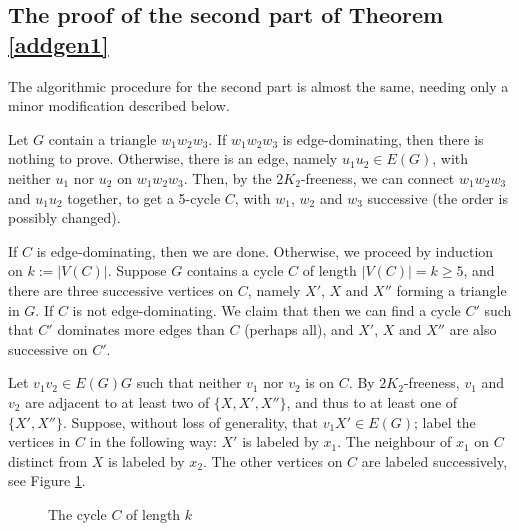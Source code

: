 \documentclass{amsart}
\theoremstyle{definition}
\begin{document}
\subsection{The proof of the second part of Theorem  \ref{addgen1}}
The algorithmic procedure for the second part is almost the same, needing only a minor
modification described below.

Let $G$  contain a triangle $w_1w_2w_3$.
If $w_1w_2w_3$ is edge-dominating, then there is nothing to prove. Otherwise, there is an edge, namely $u_1u_2\in E(G)$, with neither $u_1$ nor $u_2$  on $w_1w_2w_3$. Then, by the $2K_2$-freeness, we can connect $w_1w_2w_3$ and $u_1u_2$ together, to get a 5-cycle $C$, 
with $w_1$, $w_2$ and $w_3$ successive (the order is possibly changed). 

If $C$ is edge-dominating, then we are done. Otherwise, we proceed by induction on
$k:=|V(C)|$. 
Suppose $G$ contains a cycle $C$ of length $|V(C)|=k\ge5$, and there are three successive vertices on $C$, namely $X'$, $X$ and $X''$ forming a triangle in $G$. If $C$ is not edge-dominating. 
We claim that then we can find a cycle $C'$ such that $C'$ dominates more edges than $C$ (perhaps all), 
and $X'$, $X$ and $X''$ are also successive on $C'$.

Let $v_1v_2\in E(G)G$ such that neither $v_1$ nor $v_2$ is on $C$. By $2K_2$-freeness, $v_1$ and $v_2$ are adjacent to at least two of $\{X,X',X''\}$, and thus to at least one of $\{X',X''\}$. Suppose,
without loss of generality, that $v_1X'\in E(G)$; label the vertices in $C$ in the following way:
$X'$ is labeled by $x_1$. The neighbour of $x_1$ on $C$ distinct from $X$ is labeled by $x_2$. 
The other vertices on $C$ are labeled successively, see Figure \ref{labelcycle}.

\begin{figure}[h]
\begin{center}
\end{center}
\caption{The cycle $C$ of length $k$}\label{labelcycle}
\end{figure}
\end{document}
